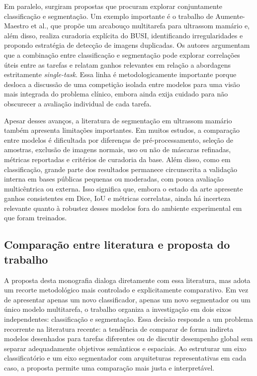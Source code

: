 \documentclass[tcc,capa]{texufpel}
\begin{document}
Em paralelo, surgiram propostas que procuram explorar conjuntamente classificação e segmentação. Um exemplo importante é o trabalho de Aumente-Maestro et al., que propõe um arcabouço multitarefa para ultrassom mamário e, além disso, realiza curadoria explícita do BUSI, identificando irregularidades e propondo estratégia de detecção de imagens duplicadas. Os autores argumentam que a combinação entre classificação e segmentação pode explorar correlações úteis entre as tarefas e relatam ganhos relevantes em relação a abordagens estritamente \textit{single-task}. Essa linha é metodologicamente importante porque desloca a discussão de uma competição isolada entre modelos para uma visão mais integrada do problema clínico, embora ainda exija cuidado para não obscurecer a avaliação individual de cada tarefa. \cite{AumenteMaestro2025}

Apesar desses avanços, a literatura de segmentação em ultrassom mamário também apresenta limitações importantes. Em muitos estudos, a comparação entre modelos é dificultada por diferenças de pré-processamento, seleção de amostras, exclusão de imagens normais, uso ou não de máscaras refinadas, métricas reportadas e critérios de curadoria da base. Além disso, como em classificação, grande parte dos resultados permanece circunscrita a validação interna em bases públicas pequenas ou moderadas, com pouca avaliação multicêntrica ou externa. Isso significa que, embora o estado da arte apresente ganhos consistentes em Dice, IoU e métricas correlatas, ainda há incerteza relevante quanto à robustez desses modelos fora do ambiente experimental em que foram treinados. \cite{Xiao2025UltrasoundSegReview,Pawlowska2023,AumenteMaestro2025}

\subsection{Comparação entre literatura e proposta do trabalho}

A proposta desta monografia dialoga diretamente com essa literatura, mas adota um recorte metodológico mais controlado e explicitamente comparativo. Em vez de apresentar apenas um novo classificador, apenas um novo segmentador ou um único modelo multitarefa, o trabalho organiza a investigação em dois eixos independentes: classificação e segmentação. Essa decisão responde a um problema recorrente na literatura recente: a tendência de comparar de forma indireta modelos desenhados para tarefas diferentes ou de discutir desempenho global sem separar adequadamente objetivos semânticos e espaciais. Ao estruturar um eixo classificatório e um eixo segmentador com arquiteturas representativas em cada caso, a proposta permite uma comparação mais justa e interpretável. \cite{Dan2024,AumenteMaestro2025}
\end{document}
